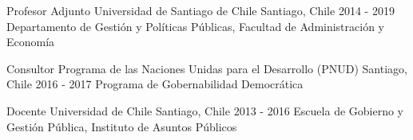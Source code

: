 





\begin{cventries}
\cventry
{Profesor Adjunto} 
{Universidad de Santiago de Chile} 
{Santiago, Chile} 
{2014 - 2019}
{Departamento de Gestión y Políticas Públicas, Facultad de Administración y Economía}\vspace{1.5mm}

\cventry
{Consultor} 
{Programa de las Naciones Unidas para el Desarrollo (PNUD)} 
{Santiago, Chile} 
{2016 - 2017}
{Programa de Gobernabilidad Democrática} \vspace{1.5mm}

\cventry
{Docente} 
{Universidad de Chile} 
{Santiago, Chile} 
{2013 - 2016}
{Escuela de Gobierno y Gestión Pública, Instituto de Asuntos Públicos}\vspace{1.5mm}
\end{cventries}
